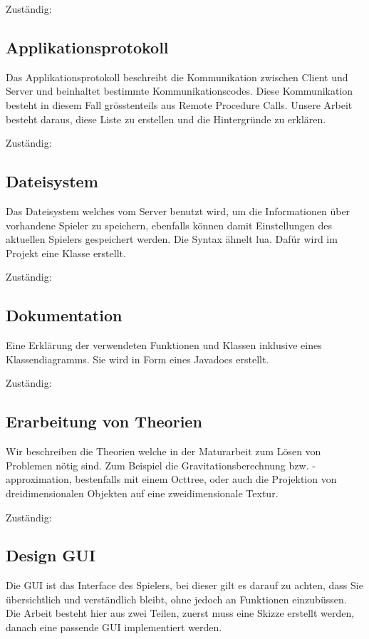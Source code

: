 \documentclass[a4paper]{article}
\begin{document}
Zuständig: 

\subsection{Applikationsprotokoll}

Das Applikationsprotokoll beschreibt die Kommunikation zwischen Client und Server und beinhaltet bestimmte Kommunikationscodes. Diese Kommunikation besteht in diesem Fall grösstenteils aus Remote Procedure Calls. Unsere Arbeit besteht daraus, diese Liste zu erstellen und die Hintergründe zu erklären.

Zuständig: 

\subsection{Dateisystem}

Das Dateisystem welches vom Server benutzt wird, um die Informationen über vorhandene Spieler zu speichern, ebenfalls können damit Einstellungen des aktuellen Spielers gespeichert werden. Die Syntax ähnelt lua. Dafür wird im Projekt eine Klasse erstellt.

Zuständig: 

\subsection{Dokumentation}

Eine Erklärung der verwendeten Funktionen und Klassen inklusive eines Klassendiagramms. Sie wird in Form eines Javadocs erstellt.

Zuständig: 

\subsection{Erarbeitung von Theorien}

Wir beschreiben die Theorien welche in der Maturarbeit zum Lösen von Problemen nötig sind. Zum Beispiel die Gravitationsberechnung bzw. -approximation, bestenfalls mit einem Octtree, oder auch die Projektion von dreidimensionalen Objekten auf eine zweidimensionale Textur.

Zuständig: 

\subsection{Design GUI}
Die GUI ist das Interface des Spielers, bei dieser gilt es darauf zu achten, dass Sie übersichtlich und verständlich bleibt, ohne jedoch an Funktionen einzubüssen. Die Arbeit besteht hier aus zwei Teilen, zuerst muss eine Skizze erstellt werden, danach eine passende GUI implementiert werden.
\end{document}
